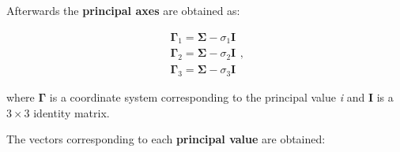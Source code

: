 \begin{itemize}
        Afterwards the \textbf{principal axes} are obtained as:

        \begin{equation}
            \begin{array}{l}
                \mathbf{\Gamma}_{1} = \mathbf{\Sigma} - \sigma_{1}\mathbf{I} \\
                \mathbf{\Gamma}_{2} = \mathbf{\Sigma} - \sigma_{2}\mathbf{I} \\
                \mathbf{\Gamma}_{3} = \mathbf{\Sigma} - \sigma_{3}\mathbf{I}
            \end{array}
        ,\end{equation}

        where $\mathbf{\Gamma}$ is a coordinate system corresponding to the
        principal value \textit{i} and $\mathbf{I}$ is a $3 \times 3$
        identity matrix.

        The vectors corresponding to each \textbf{principal value} are obtained:


\end{itemize}
